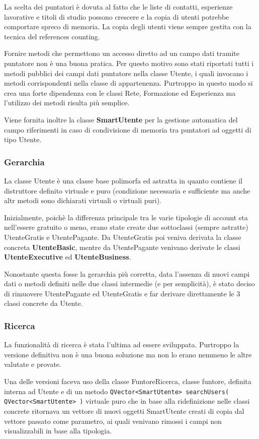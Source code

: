 \documentclass[a4paper]{article}
\begin{document}
La scelta dei puntatori è dovuta al fatto che le liste di contatti, esperienze lavorative e titoli di studio possono crescere e la copia di utenti potrebbe comportare spreco di memoria. La copia degli utenti viene sempre gestita con la tecnica del references counting.

Fornire metodi che permettono un accesso diretto ad un campo dati tramite puntatore non è una buona pratica. Per questo motivo sono stati riportati tutti i metodi pubblici dei campi dati puntatore nella classe Utente, i quali invocano i metodi corrispondenti nella classe di appartenenza. Purtroppo in questo modo si crea una forte dipendenza con le classi Rete, Formazione ed Esperienza ma l'utilizzo dei metodi risulta più semplice.

Viene fornita inoltre la classe \textbf{SmartUtente} per la gestione automatica del campo riferimenti in caso di condivisione di memoria tra puntatori ad oggetti di tipo Utente.

\subsubsection*{Gerarchia}
La classe Utente è una classe base polimorfa ed astratta in quanto contiene il distruttore definito virtuale e puro (condizione necessaria e sufficiente ma anche altr metodi sono dichiarati virtuali o virtuali puri).

Inizialmente, poichè la differenza principale tra le varie tipologie di account sta nell'essere gratuito o meno, erano state create due sottoclassi (sempre astratte) UtenteGratis e UtentePagante. Da UtenteGratis poi veniva derivata la classe concreta \textbf{UtenteBasic}, mentre da UtentePagante venivano derivate le classi \textbf{UtenteExecutive} ed \textbf{UtenteBusiness}.

Nonostante questa fosse la gerarchia più corretta, data l'assenza di nuovi campi dati o metodi definiti nelle due classi intermedie (e per semplicità), è stato deciso di rimuovere UtentePagante ed UtenteGratis e far derivare direttamente le 3 classi concrete da Utente.

\subsubsection*{Ricerca}
La funzionalità di ricerca è stata l'ultima ad essere sviluppata. Purtroppo la versione definitiva non è una buona soluzione ma non lo erano nemmeno le altre valutate e provate.

Una delle versioni faceva uso della classe FuntoreRicerca, classe funtore, definita interna ad Utente e di un metodo \texttt{QVector<SmartUtente> searchUsers( QVector<SmartUtente> )} virtuale puro che in base alla ridefinizione nelle classi concrete ritornava un vettore di nuovi oggetti SmartUtente creati di copia dal vettore passato come parametro, ai quali venivano rimossi i campi non visualizzabili in base alla tipologia. 
\end{document}
